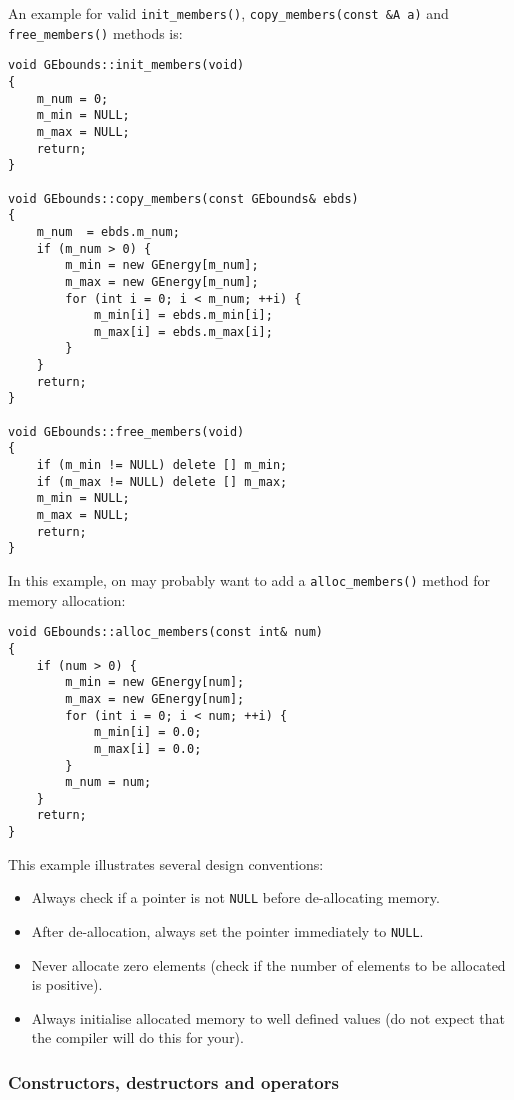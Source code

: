 \documentclass{article}[12pt,a4]
\begin{document}
An example for valid {\tt init\_members()}, {\tt copy\_members(const \&A a)} and
{\tt free\_members()} methods is:
\begin{verbatim}
void GEbounds::init_members(void)
{
    m_num = 0;
    m_min = NULL;
    m_max = NULL;
    return;
}

void GEbounds::copy_members(const GEbounds& ebds)
{
    m_num  = ebds.m_num;
    if (m_num > 0) {
        m_min = new GEnergy[m_num];
        m_max = new GEnergy[m_num];
        for (int i = 0; i < m_num; ++i) {
            m_min[i] = ebds.m_min[i];
            m_max[i] = ebds.m_max[i];
        }
    }
    return;
}

void GEbounds::free_members(void)
{
    if (m_min != NULL) delete [] m_min;
    if (m_max != NULL) delete [] m_max;
    m_min = NULL;
    m_max = NULL;
    return;
}
\end{verbatim}
In this example, on may probably want to add a {\tt alloc\_members()} method for memory allocation:
\begin{verbatim}
void GEbounds::alloc_members(const int& num)
{
    if (num > 0) {
        m_min = new GEnergy[num];
        m_max = new GEnergy[num];
        for (int i = 0; i < num; ++i) {
            m_min[i] = 0.0;
            m_max[i] = 0.0;
        }
        m_num = num;
    }
    return;
}
\end{verbatim}
This example illustrates several design conventions:
\begin{itemize}
\item Always check if a pointer is not {\tt NULL} before de-allocating memory.
\item After de-allocation, always set the pointer immediately to {\tt NULL}.
\item Never allocate zero elements (check if the number of elements to be allocated is positive).
\item Always initialise allocated memory to well defined values (do not expect that the compiler
will do this for your).
\end{itemize}


\subsubsection{Constructors, destructors and operators}
\end{document}
